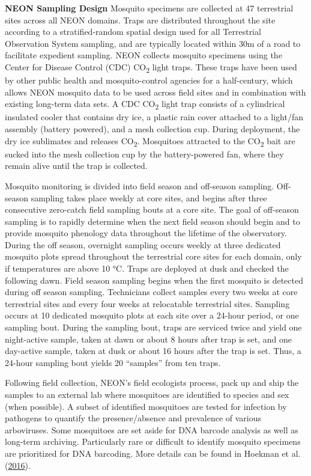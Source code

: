 \documentclass[
  12pt,
]{article}
\begin{document}
\textbf{NEON Sampling Design} Mosquito specimens are collected at 47 terrestrial sites across all NEON domains. Traps are distributed throughout the site according to a stratified-random spatial design used for all Terrestrial Observation System sampling, and are typically located within 30m of a road to facilitate expedient sampling. NEON collects mosquito specimens using the Center for Disease Control (CDC) CO\textsubscript{2} light traps. These traps have been used by other public health and mosquito-control agencies for a half-century, which allows NEON mosquito data to be used across field sites and in combination with existing long-term data sets. A CDC CO\textsubscript{2} light trap consists of a cylindrical insulated cooler that contains dry ice, a plastic rain cover attached to a light/fan assembly (battery powered), and a mesh collection cup. During deployment, the dry ice sublimates and releases CO\textsubscript{2}. Mosquitoes attracted to the CO\textsubscript{2} bait are sucked into the mesh collection cup by the battery-powered fan, where they remain alive until the trap is collected.

Mosquito monitoring is divided into field season and off-season sampling. Off-season sampling takes place weekly at core sites, and begins after three consecutive zero-catch field sampling bouts at a core site. The goal of off-season sampling is to rapidly determine when the next field season should begin and to provide mosquito phenology data throughout the lifetime of the observatory. During the off season, overnight sampling occurs weekly at three dedicated mosquito plots spread throughout the terrestrial core sites for each domain, only if temperatures are above 10 °C. Traps are deployed at dusk and checked the following dawn. Field season sampling begins when the first mosquito is detected during off season sampling. Technicians collect samples every two weeks at core terrestrial sites and every four weeks at relocatable terrestrial sites. Sampling occurs at 10 dedicated mosquito plots at each site over a 24-hour period, or one sampling bout. During the sampling bout, traps are serviced twice and yield one night-active sample, taken at dawn or about 8 hours after trap is set, and one day-active sample, taken at dusk or about 16 hours after the trap is set. Thus, a 24-hour sampling bout yields 20 ``samples'' from ten traps.

Following field collection, NEON's field ecologists process, pack up and ship the samples to an external lab where mosquitoes are identified to species and sex (when possible). A subset of identified mosquitoes are tested for infection by pathogens to quantify the presence/absence and prevalence of various arboviruses. Some mosquitoes are set aside for DNA barcode analysis as well as long-term archiving. Particularly rare or difficult to identify mosquito specimens are prioritized for DNA barcoding. More details can be found in Hoekman et al. (\protect\hyperlink{ref-hoekman2016design}{2016}).
\end{document}
